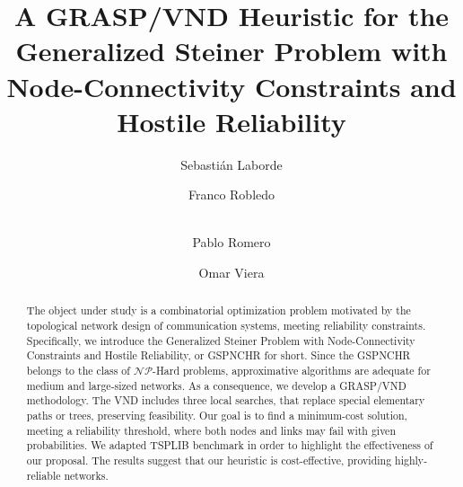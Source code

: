 \documentclass{llncs}
\begin{document}
%

\mainmatter              %
%
\title{A GRASP/VND Heuristic for the Generalized Steiner Problem with Node-Connectivity Constraints and Hostile Reliability}


\author{Sebasti\'an Laborde \and Franco Robledo \and\\
  Pablo Romero \and Omar Viera}
%

%

\maketitle              %

\begin{abstract}
The object under study is a combinatorial optimization problem motivated by the topological network design of 
communication systems, meeting reliability constraints. Specifically, we introduce the 
Generalized Steiner Problem with Node-Connectivity Constraints and Hostile Reliability, or GSPNCHR for short. 
Since the GSPNCHR belongs to the class of $\mathcal{NP}$-Hard problems, approximative algorithms are adequate for 
medium and large-sized networks. As a consequence, we develop a GRASP/VND methodology. 
The VND includes three local searches, that replace special elementary paths or trees, preserving feasibility. Our goal is to find a minimum-cost solution, meeting a reliability threshold, where both nodes and links may fail with given probabilities. We adapted TSPLIB  benchmark in order to highlight 
the effectiveness of our proposal. The results suggest that our heuristic is cost-effective, providing highly-reliable networks.
\end{abstract}
\end{document}
